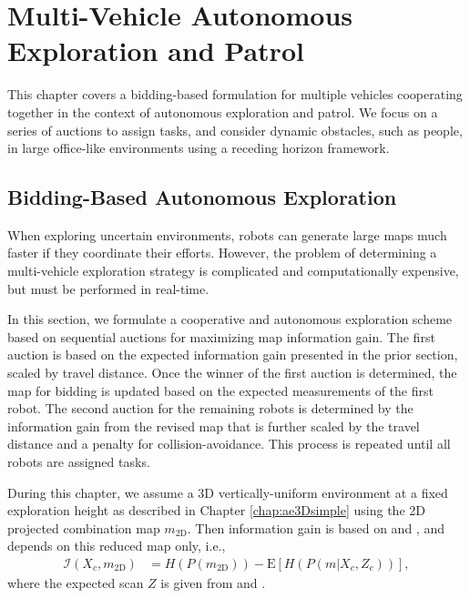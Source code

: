 
\chapter{Multi-Vehicle Autonomous Exploration and Patrol} \label{chap:multivehicle}

This chapter covers a bidding-based formulation for multiple vehicles cooperating together in the context of autonomous exploration and patrol. We focus on a series of auctions to assign tasks, and consider dynamic obstacles, such as people, in large office-like environments using a receding horizon framework.

\section{Bidding-Based Autonomous Exploration}
\label{sec:BiddingExploration}

When exploring uncertain environments, robots can generate large maps much faster if they coordinate their efforts. However, the problem of determining a multi-vehicle exploration strategy is complicated and computationally expensive, but must be performed in real-time.

In this section, we formulate a cooperative and autonomous exploration scheme based on sequential auctions for maximizing map information gain. The first auction is based on the expected information gain presented in the prior section, scaled by travel distance. Once the winner of the first auction is determined, the map for bidding is updated based on the expected measurements of the first robot. The second auction for the remaining robots is determined by the information gain from the revised map that is further scaled by the travel distance and a penalty for collision-avoidance. This process is repeated until all robots are assigned tasks. 

During this chapter, we assume a 3D vertically-uniform environment at a fixed exploration height as described in Chapter \ref{chap:ae3Dsimple} using the 2D projected combination map $ m_\text{2D}$. Then information gain is based on  and , and depends on this reduced map only, i.e.,
\begin{align}
\label{eqn:expectedInfoGainMap2D}
\mathcal I(X_c,m_\text{2D})&=H(P(m_\text{2D}))-\text{E}\left[H(P(m|X_c,Z_c))\right],
\end{align}
where the expected scan $Z$ is given from  and .


